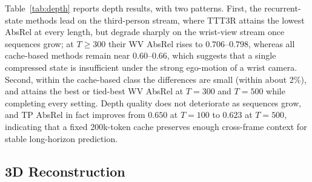 Table~\ref{tab:depth} reports depth results, with two patterns. First, the recurrent-state methods lead on the third-person stream, where TTT3R attains the lowest AbsRel at every length, but degrade sharply on the wrist-view stream once sequences grow; at $T\geq300$ their WV AbsRel rises to $0.706$--$0.798$, whereas all cache-based methods remain near $0.60$--$0.66$, which suggests that a single compressed state is insufficient under the strong ego-motion of a wrist camera. Second, within the cache-based class the differences are small (within about 2\%), and \method{} attains the best or tied-best WV AbsRel at $T{=}300$ and $T{=}500$ while completing every setting. Depth quality does not deteriorate as sequences grow, and TP AbsRel in fact improves from $0.650$ at $T{=}100$ to $0.623$ at $T{=}500$, indicating that a fixed 200k-token cache preserves enough cross-frame context for stable long-horizon prediction.

\subsection{3D Reconstruction}
\label{sec:exp-recon}

